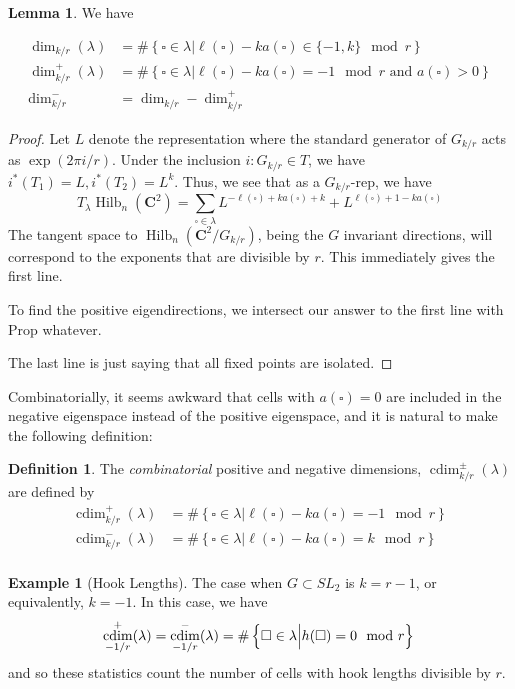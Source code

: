 \documentclass{amsart}[12pt]
\theoremstyle{definition}
\newtheorem{lemma}[dummy]{Lemma}
\newtheorem{example}[dummy]{Example}
\newtheorem{definition}[dummy]{Definition}
\newcommand{\C}{\mathbf{C}}
\DeclareMathOperator{\Hilb}{Hilb}
\DeclareMathOperator{\cdim}{cdim}
\begin{document}
\begin{lemma} We have

\begin{align*}
\dim_{k/r}(\lambda)&=\#\left\{\square\in\lambda \Big | \ell(\square)-k a(\square)\in\{-1,k\} \mod r\right\} \\
\dim^+_{k/r}(\lambda)& =\#\left\{\square\in\lambda \Big | \ell(\square)-k a(\square)=-1 \mod r \text{ and } a(\square)>0\right\} \\
\dim^-_{k/r} &= \dim_{k/r}-\dim^+_{k/r}
\end{align*}
\end{lemma}
\begin{proof}
Let $L$ denote the representation where the standard generator of $G_{k/r}$ acts as $\exp(2\pi i/r)$. Under the inclusion $i:G_{k/r}\in T$, we have $i^*(T_1)=L, i^*(T_2)=L^k$.  Thus, we see that as a $G_{k/r}$-rep, we have
$$T_\lambda \Hilb_n(\C^2)=\sum_{\square\in\lambda} L^{-\ell(\square)+ka(\square)+k}+L^{\ell(\square)+1-ka(\square)}$$
The tangent space to $\Hilb_n(\C^2/G_{k/r})$, being the $G$ invariant directions, will correspond to the exponents that are divisible by $r$.  This immediately gives the first line.

To find the positive eigendirections, we intersect our answer to the first line with Prop whatever.

The last line is just saying that all fixed points are isolated.
\end{proof}

Combinatorially, it seems awkward that cells with $a(\square)=0$ are included in the negative eigenspace instead of the positive eigenspace, and it is natural to make the following definition:
\begin{definition}
The \emph{combinatorial} positive and negative dimensions, $\cdim^\pm_{k/r}(\lambda)$ are defined by
\begin{align*}
\cdim^+_{k/r}(\lambda)&=\#\left\{\square\in\lambda \Big | \ell(\square)-k a(\square)=-1 \mod r\right\} \\
\cdim^-_{k/r}(\lambda)&=\#\left\{\square\in\lambda \Big | \ell(\square)-k a(\square)=k \mod r\right\} \\
\end{align*}
\end{definition}

\begin{example}[Hook Lengths]
The case when $G\subset SL_2$ is $k=r-1$, or equivalently, $k=-1$.  In this case, we have
$$\cdim^+_{-1/r}(\lambda)=\cdim^-_{-1/r}(\lambda)=\#\left\{\square\in\lambda \Big | h(\square)=0\mod r\right\} \\$$
and so these statistics count the number of cells with hook lengths divisible by $r$.
\end{example}
\end{document}
